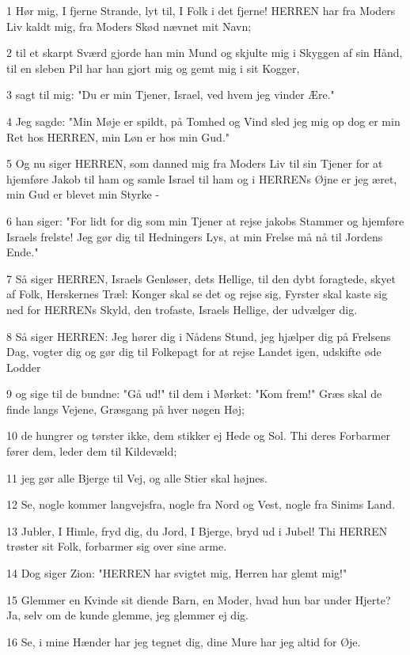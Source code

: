 \par 1 Hør mig, I fjerne Strande, lyt til, I Folk i det fjerne! HERREN har fra Moders Liv kaldt mig, fra Moders Skød nævnet mit Navn;
\par 2 til et skarpt Sværd gjorde han min Mund og skjulte mig i Skyggen af sin Hånd, til en sleben Pil har han gjort mig og gemt mig i sit Kogger,
\par 3 sagt til mig: "Du er min Tjener, Israel, ved hvem jeg vinder Ære."
\par 4 Jeg sagde: "Min Møje er spildt, på Tomhed og Vind sled jeg mig op dog er min Ret hos HERREN, min Løn er hos min Gud."
\par 5 Og nu siger HERREN, som danned mig fra Moders Liv til sin Tjener for at hjemføre Jakob til ham og samle Israel til ham og i HERRENs Øjne er jeg æret, min Gud er blevet min Styrke -
\par 6 han siger: "For lidt for dig som min Tjener at rejse jakobs Stammer og hjemføre Israels frelste! Jeg gør dig til Hedningers Lys, at min Frelse må nå til Jordens Ende."
\par 7 Så siger HERREN, Israels Genløser, dets Hellige, til den dybt foragtede, skyet af Folk, Herskernes Træl: Konger skal se det og rejse sig, Fyrster skal kaste sig ned for HERRENs Skyld, den trofaste, Israels Hellige, der udvælger dig.
\par 8 Så siger HERREN: Jeg hører dig i Nådens Stund, jeg hjælper dig på Frelsens Dag, vogter dig og gør dig til Folkepagt for at rejse Landet igen, udskifte øde Lodder
\par 9 og sige til de bundne: "Gå ud!" til dem i Mørket: "Kom frem!" Græs skal de finde langs Vejene, Græsgang på hver nøgen Høj;
\par 10 de hungrer og tørster ikke, dem stikker ej Hede og Sol. Thi deres Forbarmer fører dem, leder dem til Kildevæld;
\par 11 jeg gør alle Bjerge til Vej, og alle Stier skal højnes.
\par 12 Se, nogle kommer langvejsfra, nogle fra Nord og Vest, nogle fra Sinims Land.
\par 13 Jubler, I Himle, fryd dig, du Jord, I Bjerge, bryd ud i Jubel! Thi HERREN trøster sit Folk, forbarmer sig over sine arme.
\par 14 Dog siger Zion: "HERREN har svigtet mig, Herren har glemt mig!"
\par 15 Glemmer en Kvinde sit diende Barn, en Moder, hvad hun bar under Hjerte? Ja, selv om de kunde glemme, jeg glemmer ej dig.
\par 16 Se, i mine Hænder har jeg tegnet dig, dine Mure har jeg altid for Øje.
